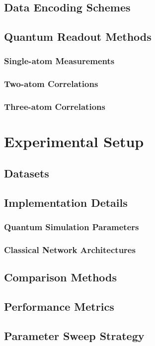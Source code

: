 \documentclass[conference]{IEEEtran}
\begin{document}
\subsection{Data Encoding Schemes}
\subsection{Quantum Readout Methods}
\subsubsection{Single-atom Measurements}
\subsubsection{Two-atom Correlations}
\subsubsection{Three-atom Correlations}

\section{Experimental Setup}
\subsection{Datasets}
\subsection{Implementation Details}
\subsubsection{Quantum Simulation Parameters}
\subsubsection{Classical Network Architectures}
\subsection{Comparison Methods}
\subsection{Performance Metrics}
\subsection{Parameter Sweep Strategy}
\end{document}
